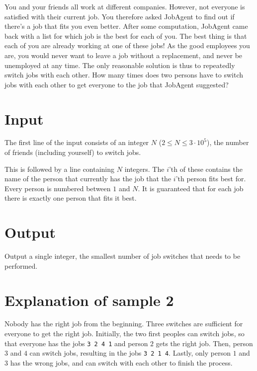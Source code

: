 You and your friends all work at different companies.
However, not everyone is satisfied with their current job.
You therefore asked JobAgent to find out if there's a job that fits you even better.
After some computation, JobAgent came back with a list for which job is the best for each of you.
The best thing is that each of you are already working at one of these jobs!
As the good employees you are, you would never want to leave a job without a replacement, and never be unemployed at any time.
The only reasonable solution is thus to repeatedly switch jobs with each other.
How many times does two persons have to switch jobs with each other to get everyone to the job that JobAgent suggested?

\section*{Input}
The first line of the input consists of an integer $N$ ($2 \le N \le 3\cdot10^5$), the number of friends (including yourself) to switch jobs.

This is followed by a line containing $N$ integers.
The $i$'th of these contains the name of the person that currently has the job that the $i$'th person fits best for.
Every person is numbered between $1$ and $N$.
It is guaranteed that for each job there is exactly one person that fits it best.

\section*{Output}
Output a single integer, the smallest number of job switches that needs to be performed.

\section*{Explanation of sample 2}
Nobody has the right job from the beginning.
Three switches are sufficient for everyone to get the right job.
Initially, the two first peoples can switch jobs, so that everyone has the jobs \texttt{3 2 4 1} and person $2$ gets the right job.
Then, person $3$ and $4$ can switch jobs, resulting in the jobs \texttt{3 2 1 4}.
Lastly, only person $1$ and $3$ has the wrong jobs, and can switch with each other to finish the process.
